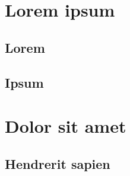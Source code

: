 \usepackage{lipsum}




\coverpage{\TITLE}{\SUBTITLE}{\AUTHOR}{\DATE}{\SUBJECT}
\newpage
\tableofcontents

\part{Lorem ipsum}
\newpage
\chapter{Lorem} \label{ch:lorem}

\newpage
\chapter{Ipsum}\label{ch:ipsum}


\part{Dolor sit amet}
\newpage
\chapter{Hendrerit sapien} \label{ch:hendrerit}

\newpage


